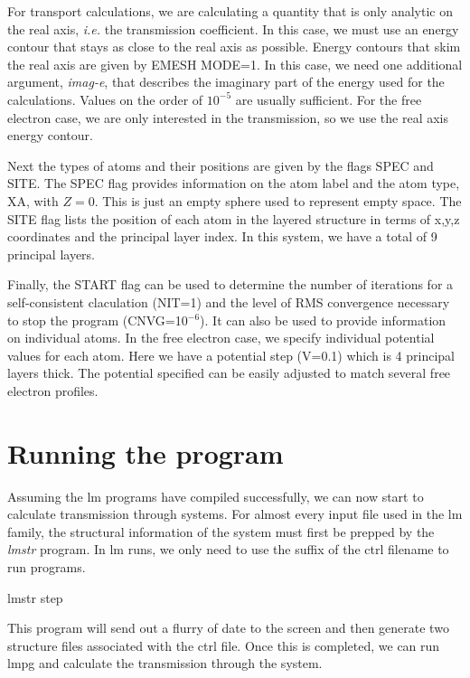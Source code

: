 \documentclass[10pt]{article}
\begin{document}
For transport calculations, we are calculating a quantity that is only analytic on the real axis, \textit{i.e.} the transmission coefficient.  In this case, we must use an energy contour that stays as close to the real axis as possible.  Energy contours that skim the real axis are given by EMESH MODE=1.  In this case, we need one additional argument, \textit{imag-e}, that describes the imaginary part of the energy used for the calculations.  Values on the order of $10^{-5}$ are usually sufficient.  For the free electron case, we are only interested in the transmission, so we use the real axis energy contour.

Next the types of atoms and their positions are given by the flags SPEC and SITE.  The SPEC flag provides information on the atom label and the atom type, XA, with $Z=0$.  This is just an empty sphere used to represent empty space.  The SITE flag lists the position of each atom in the layered structure in terms of x,y,z coordinates and the principal layer index.  In this system, we have a total of 9 principal layers.

Finally, the START flag can be used to determine the number of iterations for a self-consistent claculation (NIT=1) and the level of RMS convergence necessary to stop the program (CNVG=10$^{-6}$).  It can also be used to provide information on individual atoms.  In the free electron case, we specify individual potential values for each atom.  Here we have a potential step (V=0.1) which is 4 principal layers thick. The potential specified can be easily adjusted to match several free electron profiles.

\section{Running the program}

Assuming the lm programs have compiled successfully, we can now start to calculate transmission through systems.  For almost every input file used in the lm family, the structural information of the system must first be prepped by the \textit{lmstr} program.  In lm runs, we only need to use the suffix of the ctrl filename to run programs.

\begin{center}
lmstr step
\end{center}

This program will send out a flurry of date to the screen and then generate two structure files associated with the ctrl file.  Once this is completed, we can run lmpg and calculate the transmission through the system.
\end{document}
